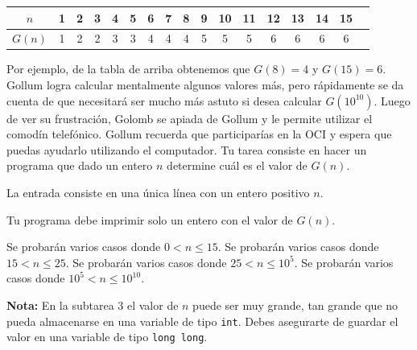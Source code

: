 \documentclass{oci}
\begin{document}
\begin{problemDescription}
\begin{center}
  \begin{tabular}{c|cccccccccccccccc}
	$n$ & 1 & 2 & 3 & 4 & 5 & 6 & 7 & 8 & 9 & 10 & 11 & 12 & 13 & 14 & 15 \\
  \hline
	$G(n)$ & 1 & 2 & 2 & 3 & 3 & 4 & 4 & 4 & 5 & 5 & 5 & 6 & 6 & 6 & 6 
  \end{tabular}
\end{center}
Por ejemplo, de la tabla de arriba obtenemos que $G(8)=4$ y $G(15)=6$. 
Gollum logra calcular mentalmente algunos valores más, pero rápidamente se da cuenta de que necesitará 
ser mucho más astuto si desea calcular $G(10^{10})$.
Luego de ver su frustración, Golomb se apiada de Gollum y le permite utilizar el comodín telefónico.
Gollum recuerda que participarías en la OCI y espera que puedas ayudarlo utilizando el computador.
Tu tarea consiste en hacer un programa que dado un entero $n$ determine cuál es el valor de $G(n)$.
\end{problemDescription}

\begin{inputDescription}
  La entrada consiste en una única línea con un entero positivo $n$.
\end{inputDescription}

\begin{outputDescription}
  Tu programa debe imprimir solo un entero con el valor de $G(n)$.
\end{outputDescription}

\begin{scoreDescription}
   Se probarán varios casos donde $0 < n \leq 15$.
   Se probarán varios casos donde $15 < n \leq 25$.
   Se probarán varios casos donde $25 < n \leq 10^5$.
   Se probarán varios casos donde $10^{5} < n \leq 10^{10}$.
\end{scoreDescription}
\textbf{Nota:} En la subtarea 3 el valor de $n$ puede ser muy grande, tan grande que no pueda almacenarse 
en una variable de tipo \texttt{int}. Debes asegurarte de guardar el valor en una variable de tipo \texttt{long long}.

\begin{sampleDescription}
\end{sampleDescription}
\end{document}
